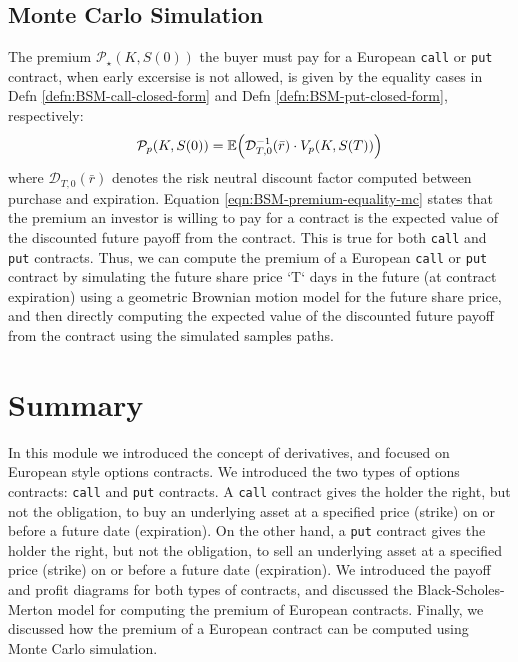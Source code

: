 \documentclass[11pt]{article}
\theoremstyle{definition}
\begin{document}
\subsection*{Monte Carlo Simulation}
The premium $\mathcal{P}_{\star}(K,S(0))$ the buyer must pay for a European \texttt{call} or \texttt{put} contract, when early excersise is not allowed, is given by the equality 
cases in Defn \ref{defn:BSM-call-closed-form} and Defn \ref{defn:BSM-put-closed-form}, respectively:
\begin{equation}\label{eqn:BSM-premium-equality-mc}
\mathcal{P}_{p}(K,S(0)) = \mathbb{E}\Bigl(\mathcal{D}^{-1}_{T,0}(\bar{r})\cdot{V_{p}}(K,S(T))\Bigr)
\end{equation}
where $\mathcal{D}_{T,0}(\bar{r})$ denotes the risk neutral discount factor computed between purchase and expiration.
Equation \ref{eqn:BSM-premium-equality-mc} states that the premium an investor is willing to pay for a contract 
is the expected value of the discounted future payoff from the contract. This is true for both \texttt{call} and \texttt{put} contracts.
Thus, we can compute the premium of a European \texttt{call} or \texttt{put} contract by simulating the future share price `T` days in the future (at contract expiration)
using a geometric Brownian motion model for the future share price, and then directly computing the expected value of the discounted future payoff from the contract 
using the simulated samples paths.

\section*{Summary}
In this module we introduced the concept of derivatives, and focused on European style options contracts.
We introduced the two types of options contracts: \texttt{call} and \texttt{put} contracts.
A \texttt{call} contract gives the holder the right, but not the obligation, to buy an underlying asset at a specified price (strike) on or before a future date (expiration).
On the other hand, a \texttt{put} contract gives the holder the right, but not the obligation, to sell an underlying asset at a specified price (strike) on or before a future date (expiration).
We introduced the payoff and profit diagrams for both types of contracts, and discussed the Black-Scholes-Merton model for computing the premium of European contracts.
Finally, we discussed how the premium of a European contract can be computed using Monte Carlo simulation.



\clearpage
\printindex
\end{document}
